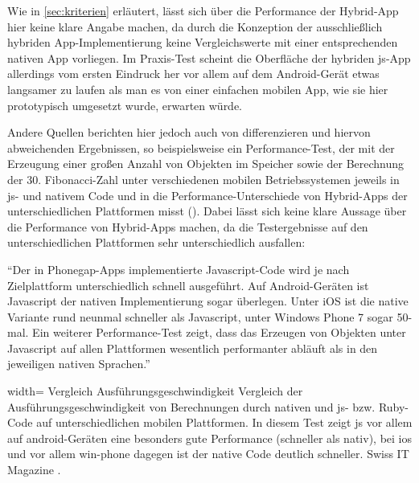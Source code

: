 Wie in \autoref{sec:kriterien} erläutert, lässt sich über die Performance der Hybrid-App hier keine klare Angabe machen, da durch die Konzeption der ausschließlich hybriden App-Implementierung keine Vergleichswerte mit einer entsprechenden nativen App vorliegen.
Im Praxis-Test scheint die Oberfläche der hybriden \gls{js}-App allerdings vom ersten Eindruck her vor allem auf dem Android-Gerät etwas langsamer zu laufen als man es von einer einfachen mobilen App, wie sie hier prototypisch umgesetzt wurde, erwarten würde.

Andere Quellen berichten hier jedoch auch von differenzieren und hiervon abweichenden Ergebnissen, so beispielsweise ein Performance-Test, der mit der Erzeugung einer großen Anzahl von Objekten im Speicher sowie der Berechnung der 30. Fibonacci-Zahl unter verschiedenen mobilen Betriebssystemen jeweils in \gls{js}- und nativem Code und in die Performance-Unterschiede von Hybrid-Apps der unterschiedlichen Plattformen misst ().
Dabei lässt sich keine klare Aussage über die Performance von Hybrid-Apps machen, da die Testergebnisse auf den unterschiedlichen Plattformen sehr unterschiedlich ausfallen:

\begin{quoting}
	\enquote{Der in Phonegap-Apps implementierte Javascript-Code wird je nach Zielplattform unterschiedlich schnell ausgeführt. Auf Android-Geräten ist Javascript der nativen Implementierung sogar überlegen. Unter iOS ist die native Variante rund neunmal schneller als Javascript, unter Windows Phone 7 sogar 50-mal. Ein weiterer Performance-Test zeigt, dass das Erzeugen von Objekten unter Javascript auf allen Plattformen wesentlich performanter abläuft als in den jeweiligen nativen Sprachen.}~\cite{Eine_App_fr_alle_Plattformen_-_IT_Magazine}
\end{quoting}
	
	{width=\fullimagesize}
	{Vergleich Ausführungsgeschwindigkeit}
	{Vergleich der Ausführungsgeschwindigkeit von Berechnungen durch nativen und \gls{js}- bzw. Ruby-Code auf unterschiedlichen mobilen Plattformen. In diesem Test zeigt \gls{js} vor allem auf \gls{android}-Geräten eine besonders gute Performance (schneller als nativ), bei \gls{ios} und vor allem \gls{win-phone} dagegen ist der native Code deutlich schneller.}
	{Swiss IT Magazine \cite{PerformanceTabelle}.}



